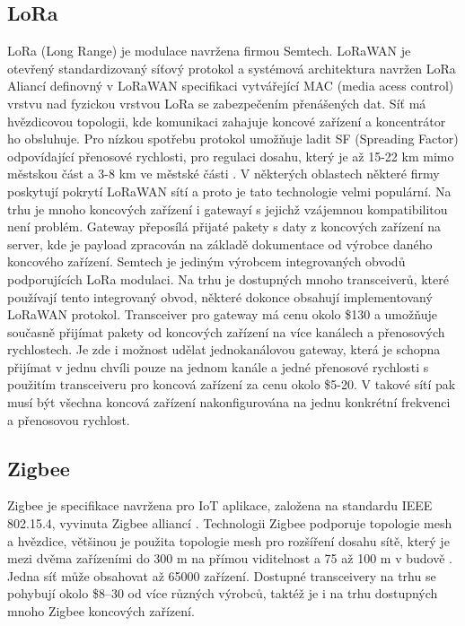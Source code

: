 \subsection{LoRa}
LoRa (Long Range) je modulace navržena firmou Semtech.
LoRaWAN je otevřený standardizovaný síťový protokol a systémová architektura navržen LoRa Aliancí definovný v LoRaWAN specifikaci \cite{lorawan_specification} vytvářející MAC (media acess control) vrstvu nad fyzickou vrstvou LoRa se zabezpečením přenášených dat. 
Síť má hvězdicovou topologii, kde komunikaci zahajuje koncové zařízení a koncentrátor ho obsluhuje.
Pro nízkou spotřebu protokol umožňuje ladit SF (Spreading Factor) odpovídající přenosové rychlosti, pro regulaci dosahu, který je až 15-22 km mimo městskou část a 3-8 km ve městské části \cite{lorawan_specification}.
V některých oblastech některé firmy poskytují pokrytí LoRaWAN sítí a proto je tato technologie velmi populární. Na trhu je mnoho koncových zařízení i gatewayí s jejichž vzájemnou kompatibilitou není problém. Gateway přeposílá přijaté pakety s daty z koncových zařízení na server, kde je payload zpracován na základě dokumentace od výrobce daného koncového zařízení.
Semtech je jediným výrobcem integrovaných obvodů podporujících LoRa modulaci. Na trhu je dostupných mnoho transceiverů, které používají tento integrovaný obvod, některé dokonce obsahují implementovaný LoRaWAN protokol.
Transceiver pro gateway má cenu okolo \$130 a umožňuje současně přijímat pakety od koncových zařízení na více kanálech a přenosových rychlostech. Je zde i možnost udělat jednokanálovou gateway, která je schopna přijímat v jednu chvíli pouze na jednom kanále a jedné přenosové rychlosti s použitím transceiveru pro koncová zařízení za cenu okolo \$5-20. V takové sítí pak musí být všechna koncová zařízení nakonfigurována na jednu konkrétní frekvenci a přenosovou rychlost.



\subsection{Zigbee}
Zigbee je specifikace navržena pro IoT aplikace, založena na standardu  IEEE 802.15.4, vyvinuta Zigbee alliancí \cite{Zigbee_alliance_about}.
Technologii Zigbee podporuje topologie mesh a hvězdice, většinou je použita topologie mesh pro rozšíření dosahu sítě, který je mezi dvěma zařízeními do 300 m na přímou viditelnost a 75 až 100 m v budově \cite{Zigbee_alliance_solution}. Jedna síť může obsahovat až 65000 zařízení.
Dostupné transceivery na trhu se pohybují okolo \$8–30 od více různých výrobců, taktéž je i na trhu dostupných mnoho Zigbee koncových zařízení.


